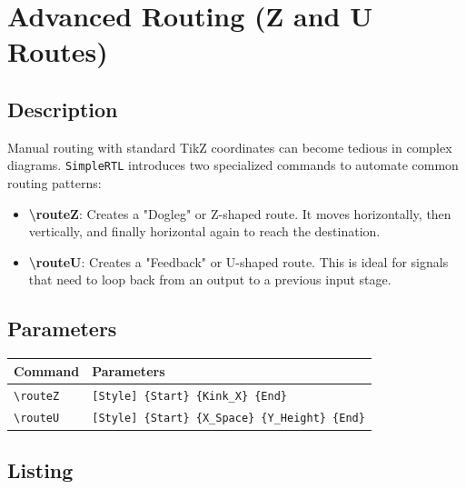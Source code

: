 \section{\sffamily Advanced Routing (Z and U Routes)}

    \subsection{\sffamily Description}
        Manual routing with standard TikZ coordinates can become tedious in complex diagrams. \texttt{SimpleRTL} introduces two specialized commands to automate common routing patterns:
        
        \begin{itemize}
            \item \textbf{\textbackslash routeZ}: Creates a "Dogleg" or Z-shaped route. It moves horizontally, then vertically, and finally horizontal again to reach the destination.
            \item \textbf{\textbackslash routeU}: Creates a "Feedback" or U-shaped route. This is ideal for signals that need to loop back from an output to a previous input stage.
        \end{itemize}

    \subsection{\sffamily Parameters}
    \begin{center}
        \begin{tabular}{lp{8cm}}
        \toprule
            \textbf{Command} & \textbf{Parameters} \\
            \midrule
            \texttt{\textbackslash routeZ} & \texttt{[Style] \{Start\} \{Kink\_X\} \{End\}} \\
            \texttt{\textbackslash routeU} & \texttt{[Style] \{Start\} \{X\_Space\} \{Y\_Height\} \{End\}} \\
            \bottomrule
        \end{tabular}
    \end{center}

    \subsection{\sffamily Listing}
\begin{RTLexample}
\end{RTLexample}